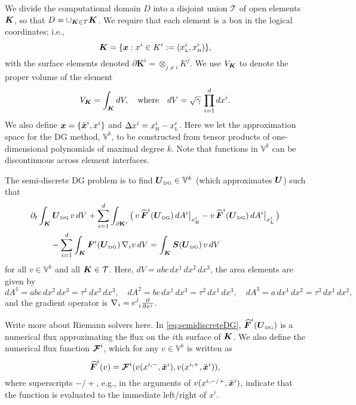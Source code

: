 \documentclass[10pt,preprint]{aastex}
\newcommand{\ee}[1]{{\color{red} #1}}
\newcommand{\dx}{\Delta x}
\newcommand{\pbK}{\partial\mathbf{K}}
\newcommand{\UDG}{\bU_{\mbox{\tiny DG}}}
\newcommand{\sumx}{\sum_{i=1}^{d}}
\begin{document}
We divide the computational domain $D$ into a disjoint union $\mathcal{T}$ of open elements $\boldsymbol{K}$, so that $D = \cup_{\boldsymbol{K} \in \mathcal{T}}\boldsymbol{K}$.  
We require that each element is a box in the logical coordinates; i.e.,
\begin{equation}
  \boldsymbol{K}=\{\boldsymbol{x} : x^{i} \in K^{i} := (x_{\mbox{\tiny L}}^{i},x_{\mbox{\tiny H}}^{i})\}, 
\end{equation}
with the surface elements denoted $\pbK^{i}=\otimes_{j\ne i}K^{j}$.  
We use $V_{\boldsymbol{K}}$ to denote the proper volume of the element
\begin{equation}
  V_{\boldsymbol{K}} = \int_{\boldsymbol{K}}dV, \quad\text{where}\quad dV = \sqrt{\gamma}\,\prod_{i=1}^{d}dx^{i}.  
\end{equation}
We also define $\boldsymbol{x}=\{\tilde{\boldsymbol{x}}^{i},x^{i}\}$ and $\dx^{i}=\xH^{i}-\xL^{i}$.  
Here we let the approximation space for the DG method, $\mathbb{V}^{k}$, to be constructed from tensor products of one-dimensional polynomials of maximal degree $k$.  
Note that functions in $\mathbb{V}^{k}$ can be discontinuous across element interfaces. 

The semi-discrete DG problem is to find $\UDG\in\mathbb{V}^{k}$ (which approximates $\boldsymbol{U}$) such that
\begin{align}
  &\partial_{t}\int_{\bK}\UDG\,v\,dV
  +\sumx\int_{\pbK^{i}}\big(\,v\,\widehat{\vect{F}}^{i}(\UDG)\,dA^{i}\big|_{\xH^{i}}-v\,\widehat{\vect{F}}^{i}(\UDG)\,dA^{i}\big|_{\xL^{i}}\,\big) \nonumber \\
  &\hspace{24pt}
  -\sumx\int_{\bK}\vect{F}^{i}(\UDG)\,\nabla_{i}v\,dV
  =\int_{\bK}\vect{S}(\UDG)\,v\,dV
  \label{eq:semidiscreteDG}
\end{align}
for all $v\in\mathbb{V}^{k}$ and all $\boldsymbol{K}\in\mathcal{T}$.  
Here, $dV=abc\,dx^{1}\,dx^{2}\,dx^{3}$, the area elements are given by
\begin{equation}
  dA^{1}=abc\,dx^{2}\,dx^{3}=\tau^{1}\,dx^{2}\,dx^{3}, \quad
  dA^{2}=bc\,dx^{1}\,dx^{3}=\tau^{2}\,dx^{1}\,dx^{3}, \quad
  dA^{3}=a\,dx^{1}\,dx^{2}=\tau^{3}\,dx^{1}\,dx^{2}, 
\end{equation}
and the gradient operator is $\nabla_{i}=e^{j}_{~i}\frac{\partial }{\partial x^{j}}$.  

\ee{Write more about Riemann solvers here.}
In \eqref{eq:semidiscreteDG}, $\vect{\widehat{F}}^{i}(\UDG)$ is a numerical flux approximating the flux on the $i$th surface of $\boldsymbol{K}$.  
We also define the numerical flux function $\boldsymbol{\mathcal{F}}^{i}$, which for any $v\in\mathbb{V}^{k}$ is written as
\begin{equation}
  \boldsymbol{\widehat{F}}^{i}(v)=\boldsymbol{\mathcal{F}}^{i}(v(x^{i,-},\tilde{\boldsymbol{x}}^{i}),v(x^{i,+},\tilde{\boldsymbol{x}}^{i})),
\end{equation}
where superscripts $-/+$, e.g., in the arguments of $v(x^{i,-/+},\tilde{\boldsymbol{x}}^{i})$, indicate that the function is evaluated to the immediate left/right of $x^{i}$.  
\end{document}
